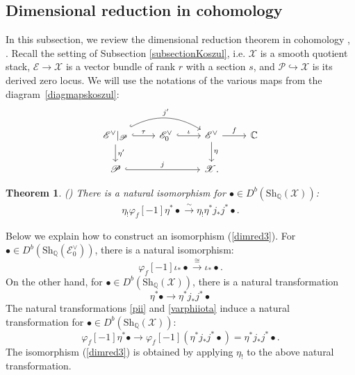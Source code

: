 \documentclass [11pt,oneside,a4paper,mathscr]{amsart}
\newtheorem{thm}{Theorem}[section]
\theoremstyle{definition}
\newcommand{\X}{\mathscr{X}}
\begin{document}
\subsection{Dimensional reduction in cohomology}\label{subsection:dimred}
In this subsection, we review the dimensional reduction theorem in cohomology \cite[Theorem A.1]{MR3667216}, \cite[Subsection 4.8]{MR2851153}. 
Recall the setting of Subsection \ref{subsectionKoszul}, 
i.e. $\X$ is a smooth quotient stack, 
$\mathscr{E} \to \X$ is a vector bundle of rank $r$
with a section $s$, and $\mathscr{P} \hookrightarrow \X$
is its derived zero locus. 
We will use the notations of the various maps from the diagram~\eqref{diagmapskoszul}:
\begin{equation}\label{diagmapskoszul2}
    \begin{tikzcd}
        \mathscr{E}^{\vee}|_{\mathscr{P}} \arrow[d, "\eta'"] \arrow[rr, bend left, hook, "j'"] \arrow[r, hook, "\tau"]  & \mathscr{E}_0^{\vee} \arrow[r, hook, "\iota"] & \mathscr{E}^{\vee} 
   \arrow[r, "f"] \arrow[d, "\eta"] & \mathbb{C} \\
    \mathscr{P} \arrow[rr, hook, "j"] & & \X.
    \end{tikzcd}
\end{equation}

\begin{thm}\emph{(\cite[Theorem~A.1]{MR3667216})}
There is a natural isomorphism for $\bullet\in D^b(\mathrm{Sh}_{\mathbb{Q}}(\X))$:
\begin{align}\label{dimred3}
\eta_!\varphi_f[-1]\eta^*\bullet\xrightarrow{\sim}\eta_!\eta^*j_*j^*\bullet.
\end{align}
\end{thm}

Below we explain how to construct an 
isomorphism (\ref{dimred3}). 
For $\bullet\in D^b(\mathrm{Sh}_{\mathbb{Q}}(\mathscr{E}^\vee_0))$, there is a natural isomorphism:
\begin{equation}\label{varphiiota}
\varphi_f[-1]\iota_*\bullet\xrightarrow{\cong} \iota_*\bullet.
\end{equation}
On the other hand, for $\bullet\in D^b(\mathrm{Sh}_{\mathbb{Q}}(\X))$,
there is a natural transformation 
\begin{equation}\label{pii}
    \eta^*\bullet\to \eta^*j_*j^*\bullet
\end{equation}
The natural transformations \eqref{pii} and \eqref{varphiiota} induce a natural transformation for $\bullet\in D^b(\mathrm{Sh}_{\mathbb{Q}}(\X))$: 
\[\varphi_f[-1]\eta^*\bullet\to\varphi_f[-1](\eta^*j_*j^*\bullet)=
\eta^*j_*j^*\bullet.\]
The isomorphism (\ref{dimred3}) is obtained by 
applying $\eta_{!}$ to the above natural transformation. 
\end{document}
